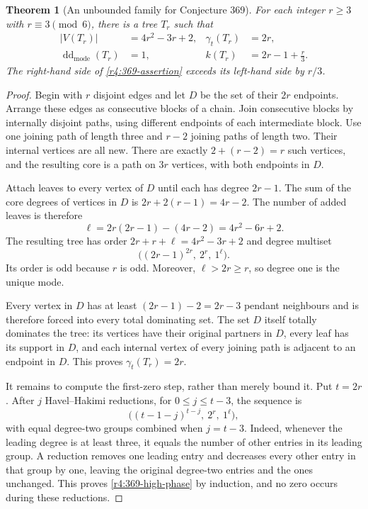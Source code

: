 \documentclass[11pt,a4paper]{article}
\newtheorem{theorem}{Theorem}[section]
\theoremstyle{remark}
\begin{document}
\begin{theorem}[An unbounded family for Conjecture 369]
\label{r4:369-family}
For each integer $r\ge3$ with $r\equiv3\pmod6$, there is a tree $T_r$
such that
\begin{align*}
  |V(T_r)|&=4r^2-3r+2, & \gamma_t(T_r)&=2r,\\
  \operatorname{dd}_{\mathrm{mode}}(T_r)&=1,
  &k(T_r)&=2r-1+\frac r3.
\end{align*}
The right-hand side of \eqref{r4:369-assertion} exceeds its left-hand side
by $r/3$.
\end{theorem}

\begin{proof}
Begin with $r$ disjoint edges and let $D$ be the set of their $2r$
endpoints.  Arrange these edges as consecutive blocks of a chain.  Join
consecutive blocks by internally disjoint paths, using different
endpoints of each intermediate block.  Use one joining path of length
three and $r-2$ joining paths of length two.  Their internal vertices are
all new.  There are exactly $2+(r-2)=r$ such vertices, and the resulting
core is a path on $3r$ vertices, with both endpoints in $D$.

Attach leaves to every vertex of $D$ until each has degree $2r-1$.
The sum of the core degrees of vertices in $D$ is
$2r+2(r-1)=4r-2$.  The number of added leaves is therefore
\begin{equation}
  \ell=2r(2r-1)-(4r-2)=4r^2-6r+2.
  \label{r4:369-leaves}
\end{equation}
The resulting tree has order $2r+r+\ell=4r^2-3r+2$ and degree multiset
\begin{equation}
  \bigl((2r-1)^{2r},\ 2^r,\ 1^\ell\bigr).
  \label{r4:369-degree-sequence}
\end{equation}
Its order is odd because $r$ is odd.  Moreover, $\ell>2r\ge r$, so degree
one is the unique mode.

Every vertex in $D$ has at least $(2r-1)-2=2r-3$ pendant neighbours and is
therefore forced into every total dominating set.  The set $D$ itself
totally dominates the tree: its vertices have their original partners
in $D$, every leaf has its support in $D$, and each internal vertex of
every joining path is adjacent to an endpoint in $D$.  This proves
$\gamma_t(T_r)=2r$.

It remains to compute the first-zero step, rather than merely bound it.
Put $t=2r$.  After $j$ Havel--Hakimi reductions, for
$0\le j\le t-3$, the sequence is
\begin{equation}
  \bigl((t-1-j)^{t-j},\ 2^r,\ 1^\ell\bigr),
  \label{r4:369-high-phase}
\end{equation}
with equal degree-two groups combined when $j=t-3$.
Indeed, whenever the leading degree is at least three, it equals the
number of other entries in its leading group.  A reduction removes one
leading entry and decreases every other entry in that group by one,
leaving the original degree-two entries and the ones unchanged.  This
proves \eqref{r4:369-high-phase} by induction, and no zero occurs during
these reductions.


\end{proof}
\end{document}
